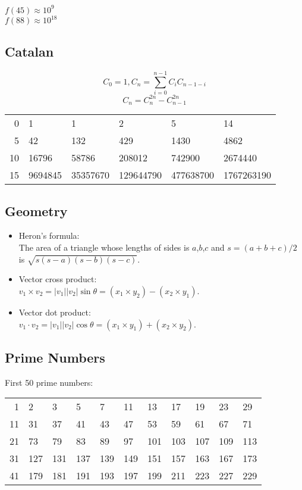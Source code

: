 \documentclass[twocolumn]{article}
\begin{document}
$f(45) \approx 10^9$\\
$f(88) \approx 10^{18}$

\subsection{Catalan}

$$C_0=1, C_n=\sum_{i=0}^{n-1} C_i C_{n-1-i}$$
$$C_n=C_n^{2n}-C_{n-1}^{2n}$$

\begin{tabular}{r|lllll}
    0 & 1 & 1 & 2 & 5 & 14 \\
    5 & 42 & 132 & 429 & 1430 & 4862 \\
    10 & 16796 & 58786 & 208012 & 742900 & 2674440 \\
    15 & 9694845 & 35357670 & 129644790 & 477638700 & 1767263190
\end{tabular}

\subsection{Geometry}

\begin{itemize}
    \item Heron's formula:\\ The area of a triangle whose lengths of sides is $a$,$b$,$c$ and $s = (a + b + c) / 2$ is $\sqrt{s(s-a)(s-b)(s-c)}$.
    \item Vector cross product:\\ $v_1 \times v_2 = |v_1||v_2| \sin \theta = (x_1 \times y_2) - (x_2 \times y_1)$.
    \item Vector dot product:\\ $v_1 \cdot v_2 = |v_1||v_2| \cos \theta = (x_1 \times y_1) + (x_2 \times y_2)$.
\end{itemize}

\subsection{Prime Numbers}

First 50 prime numbers:\\
\begin{tabular}{r|llllllllll}
    1 & 2 & 3 & 5 & 7 & 11 & 13 & 17 & 19 & 23 & 29\\
    11 & 31 & 37 & 41 & 43 & 47 & 53 & 59 & 61 & 67 & 71\\
    21 & 73 & 79 & 83 & 89 & 97 & 101 & 103 & 107 & 109 & 113\\
    31 & 127 & 131 & 137 & 139 & 149 & 151 & 157 & 163 & 167 & 173\\
    41 & 179 & 181 & 191 & 193 & 197 & 199 & 211 & 223 & 227 & 229
\end{tabular}
\end{document}
